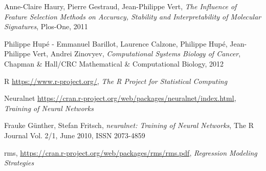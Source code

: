 \documentclass[a4paper]{article}
\begin{document}
\begin{thebibliography}{some}


Anne-Claire Haury, Pierre Gestraud, Jean-Philippe Vert, \emph{The Influence of Feature Selection Methods on Accuracy,
Stability and Interpretability of Molecular Signatures}, Plos-One, 2011

Philippe Hup\'e - Emmanuel Barillot, Laurence Calzone, Philippe Hup\'e, Jean-Philippe Vert, Andrei Zinovyev, \emph{Computational Systems Biology of Cancer}, Chapman \& Hall/CRC Mathematical \& Computational Biology, 2012

\textsf{R} \url{https://www.r-project.org/},
\emph{The R Project for Statistical Computing}

Neuralnet \url{https://cran.r-project.org/web/packages/neuralnet/index.html},
\emph{Training of Neural Networks}

Frauke G\"unther, Stefan Fritsch, \emph{neuralnet: Training of Neural Networks}, The R Journal Vol. 2/1, June 2010, ISSN 2073-4859 

rms, \url{https://cran.r-project.org/web/packages/rms/rms.pdf},
\emph{Regression Modeling Strategies}

\end{thebibliography}
\end{document}
